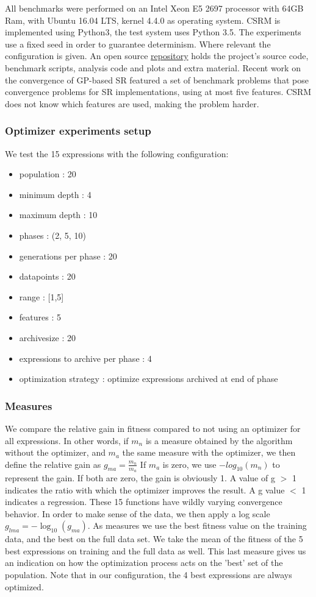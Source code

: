 All benchmarks were performed on an Intel Xeon E5 2697 processor with 64GB Ram, with Ubuntu 16.04 LTS, kernel 4.4.0 as operating system. CSRM is implemented using Python3, the test system uses Python 3.5.  The experiments use a fixed seed in order to guarantee determinism. Where relevant the configuration is given. An open source \href{https://bitbucket.org/bcardoen/csrm}{repository} holds the project's source code, benchmark scripts, analysis code and plots and extra material. 
Recent work on the convergence of GP-based SR \cite{SRAccur, SRBaseline} featured a set of benchmark problems that pose convergence problems for SR implementations, using at most five features. CSRM does not know which features are used, making the problem harder. 
\subsubsection{Optimizer experiments setup}
We test the 15 expressions with the following configuration:
\begin{itemize}
\item population : 20
\item minimum depth : 4
\item maximum depth : 10
\item phases : (2, 5, 10)
\item generations per phase : 20
\item datapoints : 20
\item range : [1,5]
\item features : 5
\item archivesize : 20
\item expressions to archive per phase : 4
\item optimization strategy : optimize expressions archived at end of phase
\end{itemize}
\subsubsection{Measures}
We compare the relative gain in fitness compared to not using an optimizer for all expressions. 
In other words, if $m_n$ is a measure obtained by the algorithm without the optimizer, and $m_a$ the same measure with the optimizer, we then define the relative gain as $ g_{ma} = \frac{m_n}{m_a} $ If $m_a$ is zero, we use $-log_{10}(m_n)$ to represent the gain. If both are zero, the gain is obviously 1. A value of g $>$ 1 indicates the ratio with which the optimizer improves the result. A g value $<$ 1 indicates a regression. These 15 functions have wildly varying convergence behavior. In order to make sense of the data, we then apply a log scale $ g_{lma} = - \log_{10}(g_{ma}) $.
As measures we use the best fitness value on the training data, and the best on the full data set. We take the mean of the fitness of the 5 best expressions on training and the full data as well. This last measure gives us an indication on how the optimization process acts on the 'best' set of the population. Note that in our configuration, the 4 best expressions are always optimized.
